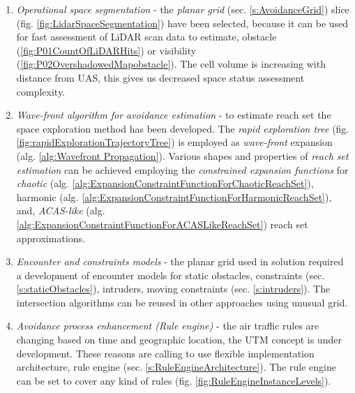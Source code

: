 \begin{enumerate}
    \item \emph{Operational space segmentation} - the \emph{planar grid} (sec. \ref{s:AvoidanceGrid}) slice (fig. \ref{fig:LidarSpaceSegmentation}) have been selected, because it can be used for fast assessment of LiDAR scan data to estimate, obstacle (\ref{fig:P01CountOfLiDARHits}) or visibility (\ref{fig:P02OvershadowedMapobstacle}). The cell volume is increasing with distance from UAS, this gives us decreased space status assessment complexity.
    
    \item \emph{Wave-front algorithm for avoidance estimation} - to estimate reach set the space exploration method has been developed. The \emph{rapid exploration tree} (fig. \ref{fig:rapidExplorationTrajectoryTree}) is employed as \emph{wave-front} expansion (alg. \ref{alg:Wavefront Propagation}). Various shapes and properties of \emph{reach set estimation} can be achieved employing the \emph{constrained expansion functions} for \emph{chaotic} (alg. \ref{alg:ExpansionConstraintFunctionForChaoticReachSet}), harmonic (alg. \ref{alg:ExpansionConstraintFunctionForHarmonicReachSet}), and, \emph{ACAS-like} (alg. \ref{alg:ExpansionConstraintFunctionForACASLikeReachSet}) reach set approximations.
    
    \item \emph{Encounter and constraints models} - the planar grid used in solution required a development of encounter models for static obstacles, constraints (sec. \ref{s:staticObstacles}), intruders, moving constraints (sec. \ref{s:intruders}). The intersection algorithms can be reused in other approaches using unusual grid.
    
    \item \emph{Avoidance process enhancement (Rule engine)} - the air traffic rules are changing based on time and geographic location, the UTM concept is under development. These reasons are calling to use flexible implementation architecture, rule engine (sec. \ref{s:RuleEngineArchitecture}). The rule engine can be set to cover any kind of rules (fig. \ref{fig:RuleEngineInstanceLevels}).
\end{enumerate}